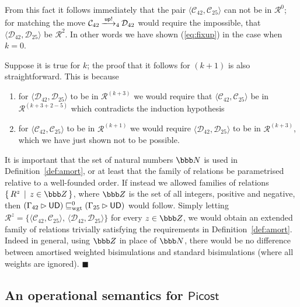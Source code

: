 \documentclass{LMCS}
\newcommand{\pfn}[1]{\mathsf{#1}}  \newcommand{\cfn}[1]{\mathsf{#1}}  \newcommand{\ownfnt}[1]{{\mathsf{#1}}}
\newcommand{\picost}{\ensuremath{\pfn{Picost}}\xspace}
\newcommand{\with}{\mathbin \rhd}
\newcommand{\nats}{\ensuremath{\bbb N}\xspace}
\newcommand{\amort}[1]{\mathrel{\sqsubseteq_{\rm wgt}^{#1}}}
\def\pair(#1,#2){\langle #1 , #2 \rangle}\newcommand{\parrow}{ \mathbin{\rightharpoonup}}
\newcommand{\setof}[2]{\{ \, #1 \, \mid \, #2 \, \}}\newcommand{\sset}[1]{\{ {#1}  \}  }
\newcommand{\calR}{\mathbin{\mathcal{R}}}
\newcommand{\calC}{\mathcal{C}}
\newcommand{\calD}{\mathcal{D}}
\newcommand{\ar}[1]{\mathbin{\xlongrightarrow{ #1}}}
\newcommand{\EndDefBox}{\null\hfill$\blacksquare$}
\newcommand{\boxHere}{\global\let\EndProof\empty\EndDefBox}
\begin{document}
\begin{exa}
From this fact it follows immediately that the pair
$\pair(\calC_{42},\calC_{25})$ can not be in $\calR^0$; 
for matching the move 
\begin{math}
  \calC_{42} \ar{\Up!}_4 \calD_{42}
\end{math}
would require the impossible, that  $\pair(\calD_{42}, \calD_{25})$ be
$\calR^2$. In other words we have shown (\ref{eq:fixup}) in the case 
when $k=0$.

Suppose it is true for $k$; the proof that it follows for $(k+1)$ is
also straightforward. This is because
\begin{enumerate}[$\bullet$]
\item for $\pair(\calD_{42},\calD_{25})$ to be in $\calR^{(k+3)}$ we would
require that $\pair(\calC_{42},\calC_{25})$ be in $\calR^{(k+3+2-5)}$
which contradicts the induction hypothesis

\item for $\pair(\calC_{42},\calC_{25})$ to be in $\calR^{(k+1)}$ we would
require  $\pair(\calD_{42},\calD_{25})$ to be in $\calR^{(k+3)}$, which we have
just shown not to be possible.
\end{enumerate}


It  is important that the set of natural numbers $\nats$ is used in
Definition~\ref{def:amort}, or at least that the family of relations
be parametrised relative to a well-founded order. If instead we
allowed families of relations $\setof{R^z}{z \in {\bbb Z}}$, where ${\bbb Z}$ is the
set of all integers, positive and negative, then
\begin{math}
  (\Gamma_{42} \with \UD)  \amort{0}  (\Gamma_{25} \with \UD) 
\end{math}
would follow. Simply letting 
\begin{math}
  \calR^z = \sset{\pair(\calC_{42},\calC_{25}),\, \pair(\calD_{42},\calD_{25})}
\end{math}
for every $z \in {\bbb Z}$, we would obtain an extended family of relations trivially
satisfying the requirements in Definition~\ref{def:amort}.
Indeed in general, using ${\bbb Z}$ in place of \nats, there would be no difference between 
amortised weighted bisimulations and standard bisimulations (where all weights are ignored). 
 \boxHere
\end{exa}



\subsection{An operational semantics for  \picost}
\end{document}
